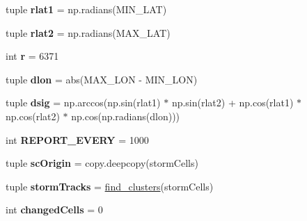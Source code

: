\begin{DoxyCompactItemize}
\item 
\hypertarget{namespacebest__track_a761777735bd7f69e5209f504e9a29091}{tuple {\bfseries rlat1} = np.\-radians(M\-I\-N\-\_\-\-L\-A\-T)}\label{namespacebest__track_a761777735bd7f69e5209f504e9a29091}

\item 
\hypertarget{namespacebest__track_a02f33965c52d3a103980046e92f12945}{tuple {\bfseries rlat2} = np.\-radians(M\-A\-X\-\_\-\-L\-A\-T)}\label{namespacebest__track_a02f33965c52d3a103980046e92f12945}

\item 
\hypertarget{namespacebest__track_a11240cf571359982cbebcdce38208efd}{int {\bfseries r} = 6371}\label{namespacebest__track_a11240cf571359982cbebcdce38208efd}

\item 
\hypertarget{namespacebest__track_a72a0c37e3d8f971a7055e50fe1e166f4}{tuple {\bfseries dlon} = abs(M\-A\-X\-\_\-\-L\-O\-N -\/ M\-I\-N\-\_\-\-L\-O\-N)}\label{namespacebest__track_a72a0c37e3d8f971a7055e50fe1e166f4}

\item 
\hypertarget{namespacebest__track_ab27e08263eb9b2be8acdd5ec80415725}{tuple {\bfseries dsig} = np.\-arccos(np.\-sin(rlat1) $\ast$ np.\-sin(rlat2) + np.\-cos(rlat1) $\ast$ np.\-cos(rlat2) $\ast$ np.\-cos(np.\-radians(dlon)))}\label{namespacebest__track_ab27e08263eb9b2be8acdd5ec80415725}

\item 
\hypertarget{namespacebest__track_a943714cd9e0afe14de5022af54c64807}{int {\bfseries R\-E\-P\-O\-R\-T\-\_\-\-E\-V\-E\-R\-Y} = 1000}\label{namespacebest__track_a943714cd9e0afe14de5022af54c64807}

\item 
\hypertarget{namespacebest__track_ab64b0862c594bac75644b66c8aa9ce27}{tuple {\bfseries sc\-Origin} = copy.\-deepcopy(storm\-Cells)}\label{namespacebest__track_ab64b0862c594bac75644b66c8aa9ce27}

\item 
\hypertarget{namespacebest__track_a2c30d7c02e744ea71aa8e4e9f5a1ee9c}{tuple {\bfseries storm\-Tracks} = \hyperlink{namespacebest__track_a74c5b356df078415ee8680f2ad29de9e}{find\-\_\-clusters}(storm\-Cells)}\label{namespacebest__track_a2c30d7c02e744ea71aa8e4e9f5a1ee9c}

\item 
\hypertarget{namespacebest__track_a05c5a753684296564db853aae79e2df8}{int {\bfseries changed\-Cells} = 0}\label{namespacebest__track_a05c5a753684296564db853aae79e2df8}


\end{DoxyCompactItemize}
